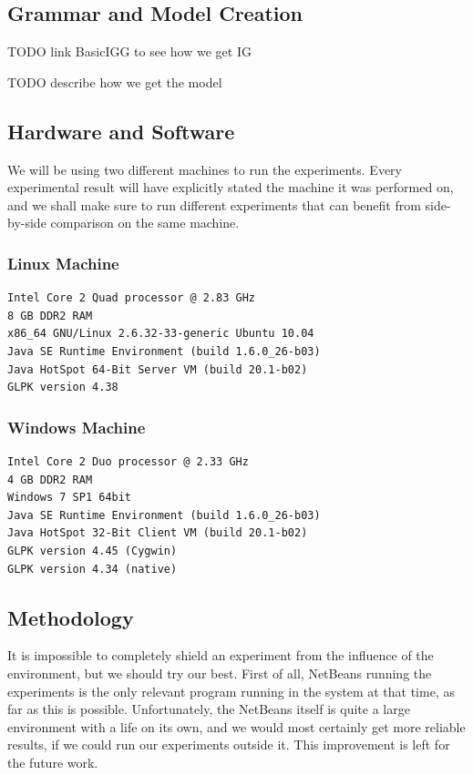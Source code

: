 \subsection{Grammar and Model Creation}

TODO link BasicIGG to see how we get IG

TODO describe how we get the model

\subsection{Hardware and Software}

We will be using two different machines to run the experiments. Every experimental result will have explicitly stated the machine it was performed on, and we shall make sure to run different experiments that can benefit from side-by-side comparison on the same machine.

\subsubsection{Linux Machine}

\begin{verbatim}
Intel Core 2 Quad processor @ 2.83 GHz
8 GB DDR2 RAM
x86_64 GNU/Linux 2.6.32-33-generic Ubuntu 10.04
Java SE Runtime Environment (build 1.6.0_26-b03)
Java HotSpot 64-Bit Server VM (build 20.1-b02)
GLPK version 4.38
\end{verbatim}

\subsubsection{Windows Machine}

\begin{verbatim}
Intel Core 2 Duo processor @ 2.33 GHz
4 GB DDR2 RAM
Windows 7 SP1 64bit
Java SE Runtime Environment (build 1.6.0_26-b03)
Java HotSpot 32-Bit Client VM (build 20.1-b02)
GLPK version 4.45 (Cygwin)
GLPK version 4.34 (native)
\end{verbatim}

\subsection{Methodology}

It is impossible to completely shield an experiment from the influence of the environment, but we should try our best. First of all, NetBeans running the experiments is the only relevant program running in the system at that time, as far as this is possible. Unfortunately, the NetBeans itself is quite a large environment with a life on its own, and we would most certainly get more reliable results, if we could run our experiments outside it. This improvement is left for the future work.

